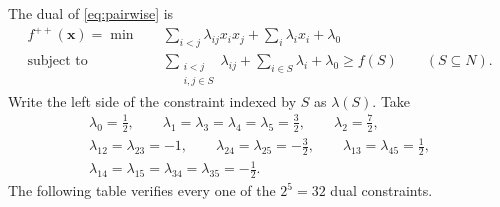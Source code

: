 The dual of \eqref{eq:pairwise} is
\[
\begin{aligned}
 f^{++}(\boldsymbol{x})=\min\quad
 &\sum_{i<j}\lambda_{ij}x_i x_j+
   \sum_i\lambda_i x_i+\lambda_0\\
 \text{subject to}\quad
 &\sum_{\substack{i<j\\i,j\in S}}\lambda_{ij}
   +\sum_{i\in S}\lambda_i+\lambda_0\geq f(S)
   \qquad(S\subseteq N).
\end{aligned}
\]
Write the left side of the constraint indexed by $S$ as $\lambda(S)$.  Take
\[
\begin{gathered}
 \lambda_0=\frac12,\qquad
 \lambda_1=\lambda_3=\lambda_4=\lambda_5=\frac32,\qquad
 \lambda_2=\frac72,\\
 \lambda_{12}=\lambda_{23}=-1,\qquad
 \lambda_{24}=\lambda_{25}=-\frac32,\qquad
 \lambda_{13}=\lambda_{45}=\frac12,\\
 \lambda_{14}=\lambda_{15}=\lambda_{34}=\lambda_{35}=-\frac12.
\end{gathered}
\]
The following table verifies every one of the $2^5=32$ dual constraints.
